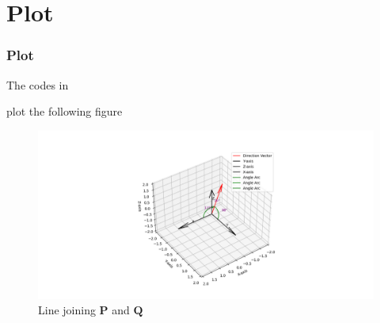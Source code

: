 \documentclass{beamer}
\theoremstyle{remark}
\let\vec\mathbf
\begin{document}
\section{Plot}

	\begin{frame}
		\frametitle{Plot}
The codes in 
   \small

plot the following figure

			
    \begin{figure}[h!]
   \centering
   \includegraphics[width=\linewidth]{Figures/Figure_1.png}
	  \caption{Line joining $\vec{P}$ and $\vec{Q}$}
   \label{stemplot}
\end{figure}
\end{frame}
   
\end{document}
